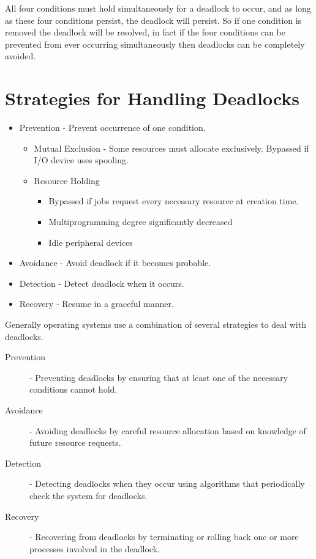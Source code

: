 \documentclass[12pt letter]{report}
\begin{document}
All four conditions must hold simultaneously for a deadlock to occur,
and as long as these four conditions persist, the deadlock will
persist. So if one condition is removed the deadlock will be
resolved, in fact if the four conditions can be prevented from ever
occurring simultaneously then deadlocks can be completely avoided.

\section{Strategies for Handling Deadlocks}
\begin{itemize}
  \item Prevention - Prevent occurrence of one condition.
    \begin{itemize}
      \item Mutual Exclusion - Some resources must allocate
        exclusively. Bypassed if I/O device uses spooling.
      \item  Resource Holding
        \begin{itemize}
          \item Bypassed if jobs request every necessary resource at
            creation time.
          \item  Multiprogramming degree significantly decreased
          \item  Idle peripheral devices
        \end{itemize}

    \end{itemize}
  \item  Avoidance - Avoid deadlock if it becomes probable.
  \item Detection - Detect deadlock when it occurs.
  \item  Recovery - Resume in a graceful manner.
\end{itemize}

Generally operating systems use a combination of several strategies
to deal with deadlocks.
\begin{description}
  \item[Prevention] - Preventing deadlocks by ensuring that at least
    one of the necessary conditions cannot hold.
  \item[Avoidance] - Avoiding deadlocks by careful resource allocation
    based on knowledge of future resource requests.
  \item[Detection] - Detecting deadlocks when they occur using
    algorithms that periodically check the system for deadlocks.
  \item[Recovery] - Recovering from deadlocks by terminating or
    rolling back one or more processes involved in the deadlock.
\end{description}
\end{document}
